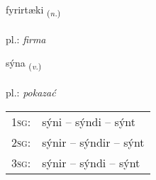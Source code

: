\documentclass[frontgrid, backgrid]{flacards}\usepackage[]{graphicx}\usepackage[]{xcolor}
\begin{document}
\renewcommand{\flhead}{\vskip5pt \fboxsep=0pt {\small\bfseries\footnotesize Nafnorð | Noun}}
\renewcommand{\fcfoot}{\vskip5pt \fboxsep=0pt \hspace{2pt}{\small\bfseries\footnotesize 1K}}

\renewcommand{\blhead}{\vskip5pt {\small\bfseries\footnotesize Nafnorð | Noun }}
\renewcommand{\bcfoot}{\vskip5pt \hspace{2pt}{\small\bfseries\footnotesize 1K}}


{fyrirtæki \small{\textsubscript{(\textit{n.})}} \\[1ex] %
 \\
pl.: \emph{firma} \\  [2ex]
\renewcommand*{\arraystretch}{0.8}
}

\renewcommand{\flhead}{\vskip5pt \fboxsep=0pt {\small\bfseries\footnotesize Sagnorð | Verb}}
\renewcommand{\fcfoot}{\vskip5pt \fboxsep=0pt \hspace{2pt}{\small\bfseries\footnotesize 1K}}

\renewcommand{\blhead}{\vskip5pt {\small\bfseries\footnotesize Sagnorð | Verb }}
\renewcommand{\bcfoot}{\vskip5pt \hspace{2pt}{\small\bfseries\footnotesize 1K}}


{sýna \small{\textsubscript{(\textit{v.})}} \\[1ex] %
\textphonetic{[siːna]} \\
pl.: \emph{pokazać} \\  [2ex]
\renewcommand*{\arraystretch}{0.8}
\begin{tabular}{p{1cm}l}
\textsc{1sg}: & sýni -- sýndi -- sýnt \\ 
\textsc{2sg}: & sýnir -- sýndir -- sýnt \\ 
\textsc{3sg}: & sýnir -- sýndi -- sýnt \\ 
\end{tabular}
}
\end{document}
